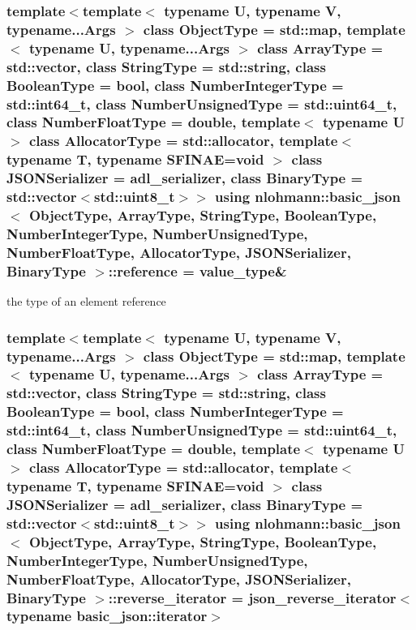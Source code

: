 \subsubsection[{\texorpdfstring{reference}{reference}}]{\setlength{\rightskip}{0pt plus 5cm}template$<$template$<$ typename U, typename V, typename...\+Args $>$ class Object\+Type = std\+::map, template$<$ typename U, typename...\+Args $>$ class Array\+Type = std\+::vector, class String\+Type  = std\+::string, class Boolean\+Type  = bool, class Number\+Integer\+Type  = std\+::int64\+\_\+t, class Number\+Unsigned\+Type  = std\+::uint64\+\_\+t, class Number\+Float\+Type  = double, template$<$ typename U $>$ class Allocator\+Type = std\+::allocator, template$<$ typename T, typename S\+F\+I\+N\+A\+E=void $>$ class J\+S\+O\+N\+Serializer = adl\+\_\+serializer, class Binary\+Type  = std\+::vector$<$std\+::uint8\+\_\+t$>$$>$ using {\bf nlohmann\+::basic\+\_\+json}$<$ Object\+Type, Array\+Type, String\+Type, Boolean\+Type, Number\+Integer\+Type, Number\+Unsigned\+Type, Number\+Float\+Type, Allocator\+Type, J\+S\+O\+N\+Serializer, Binary\+Type $>$\+::{\bf reference} =  {\bf value\+\_\+type}\&}\hypertarget{classnlohmann_1_1basic__json_a220ae98554a76205fb7f8822d36b2d5a}{}\label{classnlohmann_1_1basic__json_a220ae98554a76205fb7f8822d36b2d5a}


the type of an element reference 

\subsubsection[{\texorpdfstring{reverse\+\_\+iterator}{reverse_iterator}}]{\setlength{\rightskip}{0pt plus 5cm}template$<$template$<$ typename U, typename V, typename...\+Args $>$ class Object\+Type = std\+::map, template$<$ typename U, typename...\+Args $>$ class Array\+Type = std\+::vector, class String\+Type  = std\+::string, class Boolean\+Type  = bool, class Number\+Integer\+Type  = std\+::int64\+\_\+t, class Number\+Unsigned\+Type  = std\+::uint64\+\_\+t, class Number\+Float\+Type  = double, template$<$ typename U $>$ class Allocator\+Type = std\+::allocator, template$<$ typename T, typename S\+F\+I\+N\+A\+E=void $>$ class J\+S\+O\+N\+Serializer = adl\+\_\+serializer, class Binary\+Type  = std\+::vector$<$std\+::uint8\+\_\+t$>$$>$ using {\bf nlohmann\+::basic\+\_\+json}$<$ Object\+Type, Array\+Type, String\+Type, Boolean\+Type, Number\+Integer\+Type, Number\+Unsigned\+Type, Number\+Float\+Type, Allocator\+Type, J\+S\+O\+N\+Serializer, Binary\+Type $>$\+::{\bf reverse\+\_\+iterator} =  {\bf json\+\_\+reverse\+\_\+iterator}$<$typename {\bf basic\+\_\+json\+::iterator}$>$}\hypertarget{classnlohmann_1_1basic__json_a5b8c0ebedd920b507f4f7ff4e19bf3c6}{}\label{classnlohmann_1_1basic__json_a5b8c0ebedd920b507f4f7ff4e19bf3c6}


